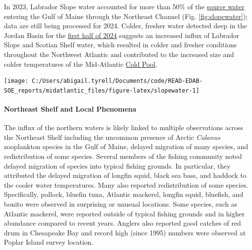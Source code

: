 \documentclass[
  10pt,
]{article}
\let\origfigure\figure
\let\endorigfigure\endfigure
\renewenvironment{figure}[1][2] {
    \expandafter\origfigure\expandafter[H]
} {
    \endorigfigure
}
\begin{document}
In 2023, Labrador Slope water accounted for more than 50\% of the \href{https://noaa-edab.github.io/catalog/slopewater.html}{source water} entering the Gulf of Maine through the Northeast Channel (Fig. \ref{fig:slopewater}); data are still being processed for 2024. Colder, fresher water detected deep in the Jordan Basin for the \href{https://noaa-edab.github.io/catalog/observation_synthesis_2024.html}{first half of 2024} suggests an increased influx of Labrador Slope and Scotian Shelf water, which resulted in colder and fresher conditions throughout the Northwest Atlantic and contributed to the increased size and colder temperatures of the Mid-Atlantic \href{https://noaa-edab.github.io/catalog/cold_pool.html}{Cold Pool}.

\begin{figure}

{\centering \texttt{[image: C:/Users/abigail.tyrell/Documents/code/READ-EDAB-SOE\_reports/midatlantic\_files/figure-latex/slopewater-1]} 

}

\caption{The proportion of Warm Slope Water (WSW) and Labrador Slope Water (LSW) enter the Gulf of Maine through the Northeast Channel. The orange and teal dashed lines represent the long-term proportion averages for the WSW and LSW respectively.}\label{fig:slopewater}
\end{figure}

\paragraph{Northeast Shelf and Local Phenomena}\label{northeast-shelf-and-local-phenomena}

The influx of the northern waters is likely linked to multiple observations across the Northeast Shelf including the uncommon presence of Arctic \emph{Calanus} zooplankton species in the Gulf of Maine, delayed migration of many species, and redistribution of some species. Several members of the fishing community noted delayed migration of species into typical fishing grounds. In particular, they attributed the delayed migration of longfin squid, black sea bass, and haddock to the cooler water temperatures. Many also reported redistribution of some species. Specifically, pollock, bluefin tuna, Atlantic mackerel, longfin squid, bluefish, and bonito were observed in surprising or unusual locations. Some species, such as Atlantic mackerel, were reported outside of typical fishing grounds and in higher abundance compared to recent years. Anglers also reported good catches of red drum in Chesapeake Bay and record high (since 1995) numbers were observed at Poplar Island survey location.
\end{document}
